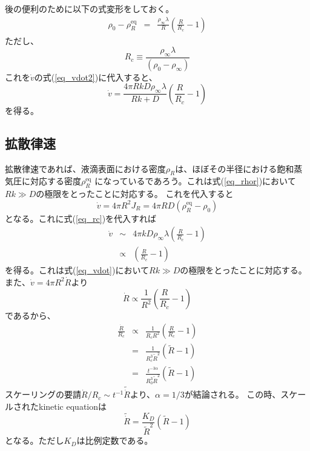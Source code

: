 \documentclass{jarticle}
\begin{document}
後の便利のために以下の式変形をしておく。
\begin{eqnarray}
    \rho_0  - \rho_R^\mathrm{eq} &=& \frac{\rho_\infty \lambda}{R} \left(\frac{R}{R_c} -1 \right) \label{eq_rc}
\end{eqnarray}
ただし、
\begin{equation}
    R_c \equiv \frac{\rho_\infty \lambda}{(\rho_0 -\rho_\infty )}
\end{equation}
これを$\dot{v}$の式(\ref{eq_vdot2})に代入すると、
\begin{equation}
    \dot{v} = \frac{4 \pi R kD \rho_\infty \lambda}{Rk + D}  \left(\frac{R}{R_c}  -1 \right) \label{eq_vdot}
\end{equation}
を得る。

\subsection{拡散律速}

拡散律速であれば、液滴表面における密度$\rho_R$は、ほぼその半径における飽和蒸気圧に対応する密度$\rho_R^\mathrm{eq}$
になっているであろう。これは式(\ref{eq_rhor})において$Rk \gg D$の極限をとったことに対応する。
これを代入すると
\begin{equation}
    \dot{v} = 4 \pi R^2 J_R = 4\pi RD(\rho_R^{\mathrm{eq}} - \rho_0 )
\end{equation}
となる。これに式(\ref{eq_rc})を代入すれば
\begin{eqnarray}
    \dot{v} &\sim& 4 \pi kD \rho_\infty \lambda  \left(\frac{R}{R_c}  -1 \right)\\
    & \propto & \left(\frac{R}{R_c}  -1 \right)
\end{eqnarray}
を得る。これは式(\ref{eq_vdot})において$Rk \gg D$の極限をとったことに対応する。
また、$\dot{v} = 4 \pi R^2 \dot{R}$より
\begin{equation}
    \dot{R} \propto \frac{1}{R^2} \left(\frac{R}{R_c}  -1 \right)
\end{equation}
であるから、
\begin{eqnarray}
    \frac{\dot{R}}{R_c} &\propto& \frac{1}{R_c R^2} \left(\frac{R}{R_c}  -1 \right)\\
    &=&  \frac{1}{R_c^3 \tilde{R}^2} (\tilde{R} -1) \\
    &=& \frac{t^{-3 \alpha}}{R_0^3 \tilde{R}^2} (\tilde{R} -1)
\end{eqnarray}
スケーリングの要請$\dot{R}/R_c \sim t^{-1} \tilde{\dot{R}}$より、$\alpha =1/3$が結論される。
この時、スケールされたkinetic equationは
\begin{equation}
    \tilde{\dot{R}} = \frac{K_D}{\tilde{R}^2} (\tilde{R} - 1)
\end{equation}
となる。ただし$K_D$は比例定数である。
\end{document}
